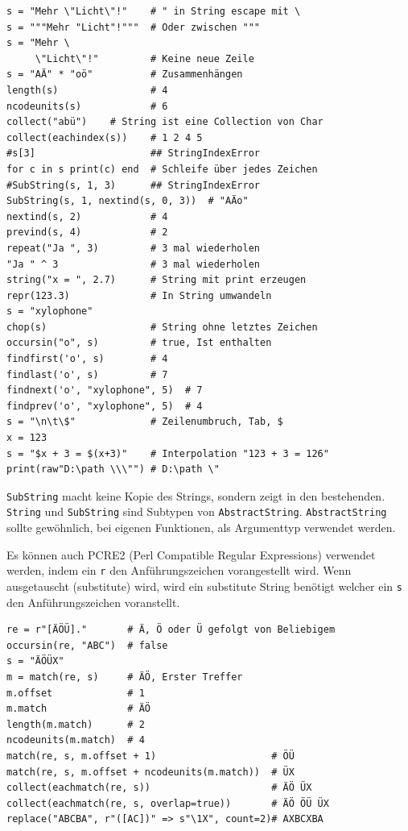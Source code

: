\documentclass[10pt,twocolumn]{scrartcl}
\begin{document}
\begin{lstlisting}
s = "Mehr \"Licht\"!"    # " in String escape mit \
s = """Mehr "Licht"!"""  # Oder zwischen """
s = "Mehr \
     \"Licht\"!"         # Keine neue Zeile
s = "AÄ" * "oö"          # Zusammenhängen
length(s)                # 4
ncodeunits(s)            # 6
collect("abü")    # String ist eine Collection von Char
collect(eachindex(s))    # 1 2 4 5
#s[3]                    ## StringIndexError
for c in s print(c) end  # Schleife über jedes Zeichen
#SubString(s, 1, 3)      ## StringIndexError
SubString(s, 1, nextind(s, 0, 3))  # "AÄo"
nextind(s, 2)            # 4
prevind(s, 4)            # 2
repeat("Ja ", 3)         # 3 mal wiederholen
"Ja " ^ 3                # 3 mal wiederholen
string("x = ", 2.7)      # String mit print erzeugen
repr(123.3)              # In String umwandeln
s = "xylophone"
chop(s)                  # String ohne letztes Zeichen
occursin("o", s)         # true, Ist enthalten
findfirst('o', s)        # 4
findlast('o', s)         # 7
findnext('o', "xylophone", 5)  # 7
findprev('o', "xylophone", 5)  # 4
s = "\n\t\$"             # Zeilenumbruch, Tab, $
x = 123
s = "$x + 3 = $(x+3)"    # Interpolation "123 + 3 = 126"
print(raw"D:\path \\\"") # D:\path \"
\end{lstlisting}

\lstinline|SubString| macht keine Kopie des Strings, sondern zeigt in den
bestehenden. \lstinline|String| und \lstinline|SubString| sind Subtypen von
\lstinline|AbstractString|. \lstinline|AbstractString| sollte gewöhnlich, bei
eigenen Funktionen, als Argumenttyp verwendet werden.

Es können auch PCRE2 (Perl Compatible Regular Expressions) verwendet werden,
indem ein \lstinline|r| den Anführungszeichen vorangestellt wird. Wenn ausgetauscht (substitute) wird, wird ein substitute String benötigt welcher ein \lstinline|s| den Anführungszeichen voranstellt.

\begin{lstlisting}
re = r"[ÄÖÜ]."       # Ä, Ö oder Ü gefolgt von Beliebigem
occursin(re, "ABC")  # false
s = "ÄÖÜX"
m = match(re, s)     # ÄÖ, Erster Treffer
m.offset             # 1
m.match              # ÄÖ
length(m.match)      # 2
ncodeunits(m.match)  # 4
match(re, s, m.offset + 1)                    # ÖÜ
match(re, s, m.offset + ncodeunits(m.match))  # ÜX
collect(eachmatch(re, s))                     # ÄÖ ÜX
collect(eachmatch(re, s, overlap=true))       # ÄÖ ÖÜ ÜX
replace("ABCBA", r"([AC])" => s"\1X", count=2)# AXBCXBA
\end{lstlisting}
\end{document}
